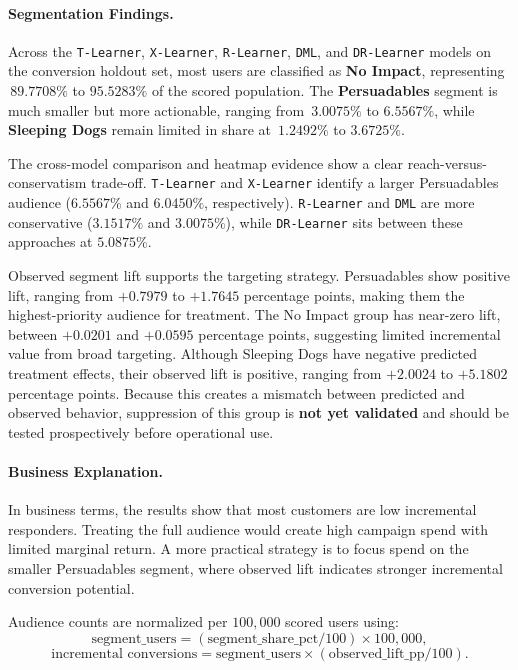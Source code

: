 \documentclass[journal,11pt,onecolumn]{IEEEtran}
\begin{document}
\paragraph{Segmentation Findings.}
Across the \texttt{T-Learner}, \texttt{X-Learner}, \texttt{R-Learner}, \texttt{DML}, and \texttt{DR-Learner} models on the conversion holdout set, most users are classified as \textbf{No Impact}, representing \(\,89.7708\%\) to \(95.5283\%\) of the scored population. The \textbf{Persuadables} segment is much smaller but more actionable, ranging from \(\,3.0075\%\) to \(6.5567\%\), while \textbf{Sleeping Dogs} remain limited in share at \(\,1.2492\%\) to \(3.6725\%\).

The cross-model comparison and heatmap evidence show a clear reach-versus-conservatism trade-off. \texttt{T-Learner} and \texttt{X-Learner} identify a larger Persuadables audience (\(6.5567\%\) and \(6.0450\%\), respectively). \texttt{R-Learner} and \texttt{DML} are more conservative (\(3.1517\%\) and \(3.0075\%\)), while \texttt{DR-Learner} sits between these approaches at \(5.0875\%\).

Observed segment lift supports the targeting strategy. Persuadables show positive lift, ranging from \(+0.7979\) to \(+1.7645\) percentage points, making them the highest-priority audience for treatment. The No Impact group has near-zero lift, between \(+0.0201\) and \(+0.0595\) percentage points, suggesting limited incremental value from broad targeting. Although Sleeping Dogs have negative predicted treatment effects, their observed lift is positive, ranging from \(+2.0024\) to \(+5.1802\) percentage points. Because this creates a mismatch between predicted and observed behavior, suppression of this group is \textbf{not yet validated} and should be tested prospectively before operational use.

\paragraph{Business Explanation.}
In business terms, the results show that most customers are low incremental responders. Treating the full audience would create high campaign spend with limited marginal return. A more practical strategy is to focus spend on the smaller Persuadables segment, where observed lift indicates stronger incremental conversion potential.

Audience counts are normalized per \(100{,}000\) scored users using:
\[
    \text{segment\_users} = (\text{segment\_share\_pct} / 100)\times 100{,}000,
\]
\[
    \text{incremental conversions} = \text{segment\_users}\times (\text{observed\_lift\_pp} / 100).
\]
\end{document}
